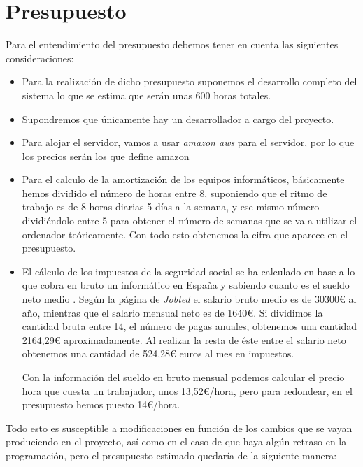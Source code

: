 \section{Presupuesto}

Para el entendimiento del presupuesto debemos tener en cuenta las siguientes consideraciones:

\begin{itemize}
	\item Para la realización de dicho presupuesto suponemos el desarrollo completo del sistema lo que se estima que serán unas 600 horas totales.
	\item Supondremos que únicamente hay un desarrollador a cargo del proyecto.
	\item Para alojar el servidor, vamos a usar \textit{amazon aws} para el servidor, por lo que los precios serán los que define amazon \cite{aws}
	\item Para el calculo de la amortización de los equipos informáticos, básicamente hemos dividido el número de horas entre 8, suponiendo que el ritmo de trabajo es de 8 horas diarias 5 días a la semana, y ese mismo número dividiéndolo entre 5 para obtener el número de semanas que se va a utilizar el ordenador teóricamente. Con todo esto obtenemos la cifra que aparece en el presupuesto.
	\item El cálculo de los impuestos de la seguridad social se ha calculado en base a lo que cobra en bruto un informático en España y sabiendo cuanto es el sueldo neto medio \cite{jobted}. Según la página de \textit{Jobted} el salario bruto medio es de 30300€ al año, mientras que el salario mensual neto es de 1640€. Si dividimos la cantidad bruta entre 14, el número de pagas anuales, obtenemos una cantidad 2164,29€ aproximadamente. Al realizar la resta de éste entre el salario neto obtenemos una cantidad de 524,28€ euros al mes en impuestos. 
	
	Con la información del sueldo en bruto mensual podemos calcular el precio hora que cuesta un trabajador, unos 13,52€/hora, pero para redondear, en el presupuesto hemos puesto 14€/hora.
	
\end{itemize}

Todo esto es susceptible a modificaciones en función de los cambios que se vayan produciendo en el proyecto, así como en el caso de que haya algún retraso en la programación, pero el presupuesto estimado quedaría de la siguiente manera:


